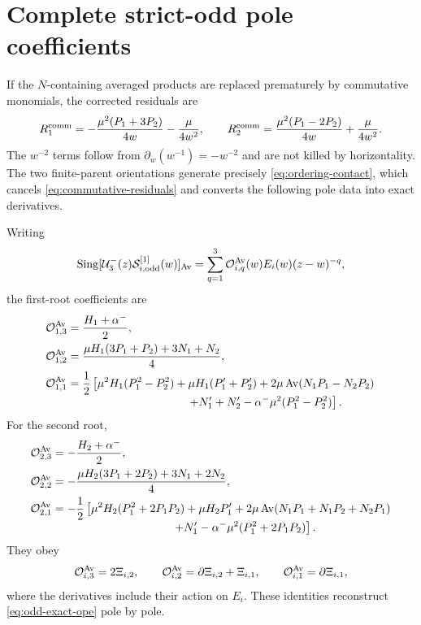 \documentclass[11pt,a4paper]{article}
\numberwithin{equation}{section}
\theoremstyle{remark}
\newcommand{\Av}[1]{\operatorname{Av}\!\left(#1\right)}
\newcommand{\Sing}{\operatorname{Sing}}
\newcommand{\cU}{\mathcal U}
\newcommand{\cS}{\mathcal S}
\begin{document}
\section{Complete strict-odd pole coefficients}
\label{app:poles}

If the $N$-containing averaged products are replaced prematurely by commutative monomials,
the corrected residuals are
\begin{equation}
 R_1^{\rm comm}=-\frac{\mu^2(P_1+3P_2)}{4w}-\frac{\mu}{4w^2},
 \qquad
 R_2^{\rm comm}=\frac{\mu^2(P_1-2P_2)}{4w}+\frac{\mu}{4w^2}.
 \label{eq:commutative-residuals}
\end{equation}
The $w^{-2}$ terms follow from $\partial_w(w^{-1})=-w^{-2}$ and are not killed by
horizontality.  The two finite-parent orientations generate precisely
\cref{eq:ordering-contact}, which cancels \cref{eq:commutative-residuals} and converts the
following pole data into exact derivatives.

Writing
\begin{equation}
 \Sing[\cU_3^-(z)\cS_{i,\rm odd}^{[1]}(w)]_{\rm Av}
 =\sum_{q=1}^{3}\mathcal O_{i,q}^{\rm Av}(w)E_i(w)(z-w)^{-q},
 \label{eq:pole-expansion}
\end{equation}
the first-root coefficients are
\begin{align}
 \mathcal O_{1,3}^{\rm Av}&=\frac{H_1+\alpha^-}{2},
 \label{eq:O13}\\
 \mathcal O_{1,2}^{\rm Av}&=
 \frac{\mu H_1(3P_1+P_2)+3N_1+N_2}{4},
 \label{eq:O12}\\
 \mathcal O_{1,1}^{\rm Av}&=\frac12\left[
 \mu^2H_1(P_1^2-P_2^2)+\mu H_1(P_1'+P_2')
 +2\mu\Av{N_1P_1-N_2P_2}
 \right.\nonumber\\[-1mm]
 &\hspace{37mm}\left.+N_1'+N_2'-\alpha^-\mu^2(P_1^2-P_2^2)
 \right].
 \label{eq:O11}
\end{align}
For the second root,
\begin{align}
 \mathcal O_{2,3}^{\rm Av}&=-\frac{H_2+\alpha^-}{2},
 \label{eq:O23}\\
 \mathcal O_{2,2}^{\rm Av}&=-
 \frac{\mu H_2(3P_1+2P_2)+3N_1+2N_2}{4},
 \label{eq:O22}\\
 \mathcal O_{2,1}^{\rm Av}&=-\frac12\left[
 \mu^2H_2(P_1^2+2P_1P_2)+\mu H_2P_1'
 +2\mu\Av{N_1P_1+N_1P_2+N_2P_1}
 \right.\nonumber\\[-1mm]
 &\hspace{37mm}\left.+N_1'-\alpha^-\mu^2(P_1^2+2P_1P_2)
 \right].
 \label{eq:O21}
\end{align}
They obey
\begin{equation}
 \mathcal O_{i,3}^{\rm Av}=2\Xi_{i,2},\qquad
 \mathcal O_{i,2}^{\rm Av}=\partial\Xi_{i,2}+\Xi_{i,1},\qquad
 \mathcal O_{i,1}^{\rm Av}=\partial\Xi_{i,1},
 \label{eq:pole-reconstruction}
\end{equation}
where the derivatives include their action on $E_i$.  These identities reconstruct
\cref{eq:odd-exact-ope} pole by pole.
\end{document}

